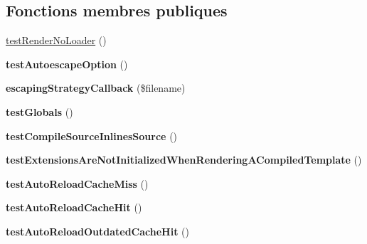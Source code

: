 \subsection*{Fonctions membres publiques}
\begin{DoxyCompactItemize}
\item 
\hyperlink{class_twig___tests___environment_test_acefad27974aa188101fc9e087e516798}{test\+Render\+No\+Loader} ()
\item 
{\bfseries test\+Autoescape\+Option} ()\hypertarget{class_twig___tests___environment_test_aaa8832482bf9dd34be5033be15b827f4}{}\label{class_twig___tests___environment_test_aaa8832482bf9dd34be5033be15b827f4}

\item 
{\bfseries escaping\+Strategy\+Callback} (\$filename)\hypertarget{class_twig___tests___environment_test_a4f63ec5feaacb676de5a8cfa61f4d11a}{}\label{class_twig___tests___environment_test_a4f63ec5feaacb676de5a8cfa61f4d11a}

\item 
{\bfseries test\+Globals} ()\hypertarget{class_twig___tests___environment_test_aadedd60d6e3b125344c380e9e187e7ad}{}\label{class_twig___tests___environment_test_aadedd60d6e3b125344c380e9e187e7ad}

\item 
{\bfseries test\+Compile\+Source\+Inlines\+Source} ()\hypertarget{class_twig___tests___environment_test_a06a3795a64071cf7483b3e1b8a9b3b8e}{}\label{class_twig___tests___environment_test_a06a3795a64071cf7483b3e1b8a9b3b8e}

\item 
{\bfseries test\+Extensions\+Are\+Not\+Initialized\+When\+Rendering\+A\+Compiled\+Template} ()\hypertarget{class_twig___tests___environment_test_a8e33a8d1d7324f83ac8d93f3fdb11a2e}{}\label{class_twig___tests___environment_test_a8e33a8d1d7324f83ac8d93f3fdb11a2e}

\item 
{\bfseries test\+Auto\+Reload\+Cache\+Miss} ()\hypertarget{class_twig___tests___environment_test_a6c4638e0d4c2e0d9c5ed8b3d974f56ec}{}\label{class_twig___tests___environment_test_a6c4638e0d4c2e0d9c5ed8b3d974f56ec}

\item 
{\bfseries test\+Auto\+Reload\+Cache\+Hit} ()\hypertarget{class_twig___tests___environment_test_a15b759ca8c299aca9e433e7655833d9b}{}\label{class_twig___tests___environment_test_a15b759ca8c299aca9e433e7655833d9b}

\item 
{\bfseries test\+Auto\+Reload\+Outdated\+Cache\+Hit} ()\hypertarget{class_twig___tests___environment_test_a17476d1a5b00ebb37e1492deadd57a5f}{}\label{class_twig___tests___environment_test_a17476d1a5b00ebb37e1492deadd57a5f}


\end{DoxyCompactItemize}

